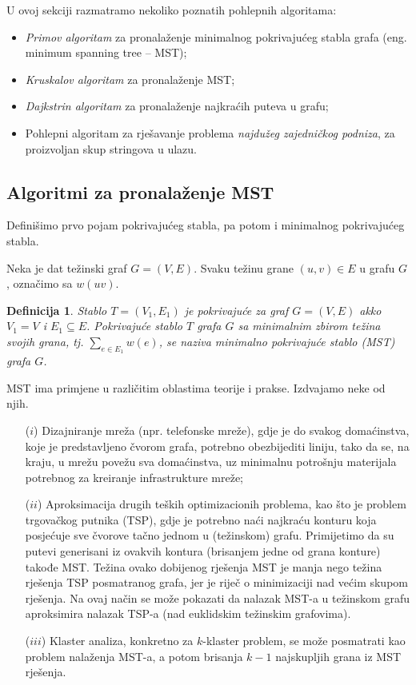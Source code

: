 \documentclass[b5paper, utf8, 11pt, colorlinks]{book}
\newtheorem{definition}{Definicija}[chapter]
\theoremstyle{definition}
\begin{document}
U ovoj sekciji razmatramo nekoliko poznatih pohlepnih algoritama:
\begin{itemize}
	\item  \emph{Primov algoritam} za pronalaženje minimalnog pokrivajućeg stabla grafa (eng. minimum spanning tree -- MST);
	\item  \emph{Kruskalov algoritam} za pronalaženje MST;
	\item  \emph{Dajkstrin algoritam} za pronalaženje najkraćih puteva u grafu;
	\item  Pohlepni algoritam za rješavanje problema \emph{najdužeg zajedničkog podniza}, za proizvoljan skup stringova u ulazu.
\end{itemize}


\subsection{Algoritmi za pronalaženje MST}

Definišimo prvo pojam pokrivajućeg stabla, pa potom i minimalnog pokrivajućeg stabla.

Neka je dat težinski graf $G=(V,E)$. Svaku težinu grane $(u,v) \in E $ u grafu $G$, označimo sa $w(uv)$. 
\begin{definition}
  Stablo $T =(V_1, E_1)$ je pokrivajuće za graf $G=(V,E)$ akko
  $V_1 = V$ i $E_1 \subseteq E$. Pokrivajuće stablo $T$ grafa $G$ sa minimalnim zbirom težina svojih grana, tj. 
  $\sum_{e \in E_1} w(e)$, se naziva minimalno pokrivajuće stablo (MST) grafa $G$. 
\end{definition}

MST ima primjene u različitim oblastima teorije i prakse. Izdvajamo neke od njih.
\begin{enumerate}
 \item[($i$)] Dizajniranje mreža (npr. telefonske mreže), gdje je do svakog domaćinstva, koje je predstavljeno čvorom grafa, potrebno obezbijediti liniju, tako da se, na kraju, u mrežu povežu sva domaćinstva, uz minimalnu potrošnju materijala potrebnog za kreiranje infrastrukture mreže;
 \item[($ii$)] Aproksimacija drugih teških optimizacionih problema, kao što je problem trgovačkog putnika (TSP), gdje je potrebno naći najkraću konturu koja posjećuje sve čvorove tačno jednom u (težinskom) grafu. Primijetimo da su putevi generisani iz ovakvih kontura (brisanjem jedne od grana konture) takođe MST. Težina ovako dobijenog rješenja MST je manja nego težina rješenja TSP posmatranog grafa, jer je riječ o minimizaciji nad većim skupom rješenja. Na ovaj način  se može pokazati da nalazak MST-a u težinskom grafu aproksimira nalazak TSP-a (nad euklidskim težinskim grafovima).
 \item[($iii$)] Klaster analiza, konkretno za $k$-klaster problem, se može posmatrati kao problem nalaženja MST-a, a potom brisanja $k-1$ najskupljih grana iz MST rješenja. 
 \end{enumerate}
\end{document}
